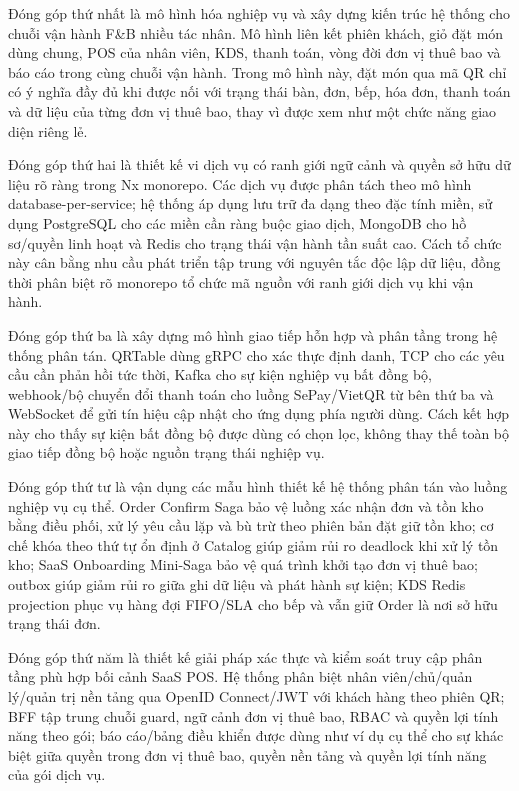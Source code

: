 Đóng góp thứ nhất là mô hình hóa nghiệp vụ và xây dựng kiến trúc hệ thống cho chuỗi vận hành F\&B nhiều tác nhân. Mô hình liên kết phiên khách, giỏ đặt món dùng chung, POS của nhân viên, KDS, thanh toán, vòng đời đơn vị thuê bao và báo cáo trong cùng chuỗi vận hành. Trong mô hình này, đặt món qua mã QR chỉ có ý nghĩa đầy đủ khi được nối với trạng thái bàn, đơn, bếp, hóa đơn, thanh toán và dữ liệu của từng đơn vị thuê bao, thay vì được xem như một chức năng giao diện riêng lẻ.

Đóng góp thứ hai là thiết kế vi dịch vụ có ranh giới ngữ cảnh và quyền sở hữu dữ liệu rõ ràng trong Nx monorepo. Các dịch vụ được phân tách theo mô hình database-per-service; hệ thống áp dụng lưu trữ đa dạng theo đặc tính miền, sử dụng PostgreSQL cho các miền cần ràng buộc giao dịch, MongoDB cho hồ sơ/quyền linh hoạt và Redis cho trạng thái vận hành tần suất cao. Cách tổ chức này cân bằng nhu cầu phát triển tập trung với nguyên tắc độc lập dữ liệu, đồng thời phân biệt rõ monorepo tổ chức mã nguồn với ranh giới dịch vụ khi vận hành.

Đóng góp thứ ba là xây dựng mô hình giao tiếp hỗn hợp và phân tầng trong hệ thống phân tán. QRTable dùng gRPC cho xác thực định danh, TCP cho các yêu cầu cần phản hồi tức thời, Kafka cho sự kiện nghiệp vụ bất đồng bộ, webhook/bộ chuyển đổi thanh toán cho luồng SePay/VietQR từ bên thứ ba và WebSocket để gửi tín hiệu cập nhật cho ứng dụng phía người dùng. Cách kết hợp này cho thấy sự kiện bất đồng bộ được dùng có chọn lọc, không thay thế toàn bộ giao tiếp đồng bộ hoặc nguồn trạng thái nghiệp vụ.

Đóng góp thứ tư là vận dụng các mẫu hình thiết kế hệ thống phân tán vào luồng nghiệp vụ cụ thể. Order Confirm Saga bảo vệ luồng xác nhận đơn và tồn kho bằng điều phối, xử lý yêu cầu lặp và bù trừ theo phiên bản đặt giữ tồn kho; cơ chế khóa theo thứ tự ổn định ở Catalog giúp giảm rủi ro deadlock khi xử lý tồn kho; SaaS Onboarding Mini-Saga bảo vệ quá trình khởi tạo đơn vị thuê bao; outbox giúp giảm rủi ro giữa ghi dữ liệu và phát hành sự kiện; KDS Redis projection phục vụ hàng đợi FIFO/SLA cho bếp và vẫn giữ Order là nơi sở hữu trạng thái đơn.

Đóng góp thứ năm là thiết kế giải pháp xác thực và kiểm soát truy cập phân tầng phù hợp bối cảnh SaaS POS. Hệ thống phân biệt nhân viên/chủ/quản lý/quản trị nền tảng qua OpenID Connect/JWT với khách hàng theo phiên QR; BFF tập trung chuỗi guard, ngữ cảnh đơn vị thuê bao, RBAC và quyền lợi tính năng theo gói; báo cáo/bảng điều khiển được dùng như ví dụ cụ thể cho sự khác biệt giữa quyền trong đơn vị thuê bao, quyền nền tảng và quyền lợi tính năng của gói dịch vụ.

